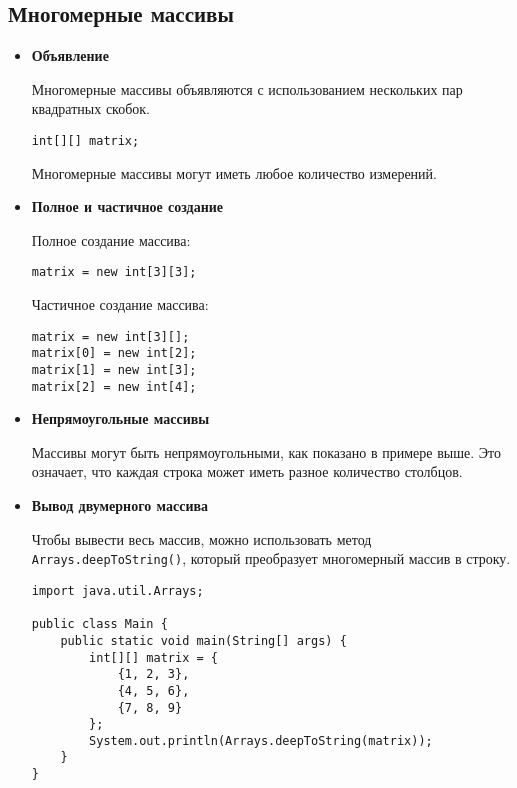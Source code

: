 \subsection{Многомерные массивы}
\begin{itemize}
    \item \textbf{Объявление}\par
    Многомерные массивы объявляются с использованием нескольких пар квадратных скобок.
    \begin{verbatim}
int[][] matrix;
    \end{verbatim}
    Многомерные массивы могут иметь любое количество измерений.

    \item \textbf{Полное и частичное создание}\par
    Полное создание массива:
    \begin{verbatim}
matrix = new int[3][3];
    \end{verbatim}
    Частичное создание массива:
    \begin{verbatim}
matrix = new int[3][];
matrix[0] = new int[2];
matrix[1] = new int[3];
matrix[2] = new int[4];
    \end{verbatim}
    
    \item \textbf{Непрямоугольные массивы}\par
    Массивы могут быть непрямоугольными, как показано в примере выше. Это означает, что каждая строка может иметь разное количество столбцов.

    \item \textbf{Вывод двумерного массива}\par
    Чтобы вывести весь массив, можно использовать метод \texttt{Arrays.deepToString()}, который преобразует многомерный массив в строку.
    \begin{verbatim}
import java.util.Arrays;

public class Main {
    public static void main(String[] args) {
        int[][] matrix = {
            {1, 2, 3},
            {4, 5, 6},
            {7, 8, 9}
        };
        System.out.println(Arrays.deepToString(matrix));
    }
}
    \end{verbatim}
\end{itemize}

